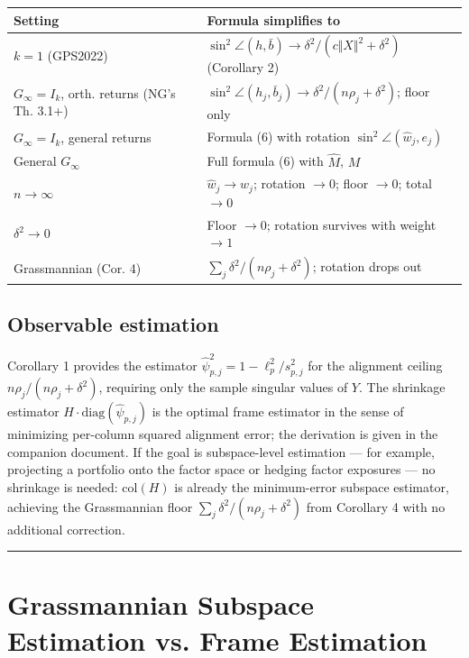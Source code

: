 \documentclass{article}
\theoremstyle{remark}
\begin{document}
\begin{center}
\begin{tabular}{|l|l|}
\hline
Setting & Formula simplifies to \\
\hline
$k=1$ (GPS2022) & $\sin^2\angle(h,\bar{b}) \to \delta^2/(c\Vert X\Vert^2+\delta^2)$ (Corollary 2) \\
\hline
$G_\infty=I_k$, orth. returns (NG's Th. 3.1+) & $\sin^2\angle(h_j,\bar{b}_j) \to \delta^2/(n\rho_j+\delta^2)$; floor only \\
\hline
$G_\infty=I_k$, general returns & Formula (6) with rotation $\sin^2\angle(\hat{w}_j,e_j)$ \\
\hline
General $G_\infty$ & Full formula (6) with $\hat{M}$, $M$ \\
\hline
$n\to\infty$ & $\hat{w}_j\to w_j$; rotation $\to 0$; floor $\to 0$; total $\to 0$ \\
\hline
$\delta^2\to 0$ & Floor $\to 0$; rotation survives with weight $\to 1$ \\
\hline
Grassmannian (Cor. 4) & $\sum_j\delta^2/(n\rho_j+\delta^2)$; rotation drops out \\
\hline
\end{tabular}
\end{center}

\subsection{Observable estimation}

Corollary 1 provides the estimator $\hat{\psi}_{p,j}^2 = 1 - \ell_p^2/s_{p,j}^2$ for the alignment ceiling $n\rho_j/(n\rho_j+\delta^2)$, requiring only the sample singular values of $Y$. The shrinkage estimator $H\cdot\mathrm{diag}(\hat{\psi}_{p,j})$ is the optimal frame estimator in the sense of minimizing per-column squared alignment error; the derivation is given in the companion document. If the goal is subspace-level estimation — for example, projecting a portfolio onto the factor space or hedging factor exposures — no shrinkage is needed: $\mathrm{col}(H)$ is already the minimum-error subspace estimator, achieving the Grassmannian floor $\sum_j\delta^2/(n\rho_j+\delta^2)$ from Corollary 4 with no additional correction.

\medskip\noindent\rule{\linewidth}{0.4pt}\medskip

\section{Grassmannian Subspace Estimation vs. Frame Estimation}
\end{document}
